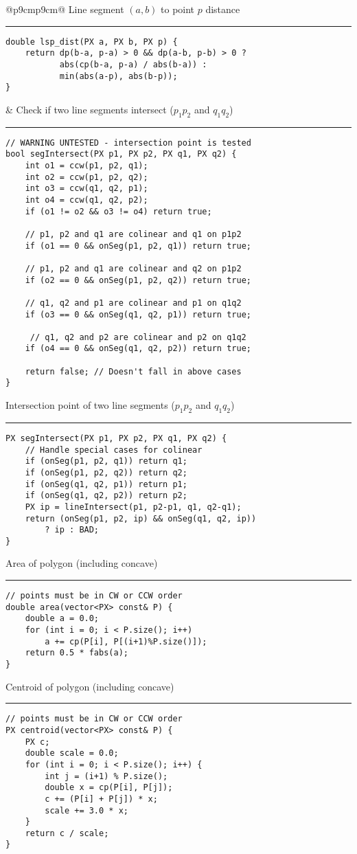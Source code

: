 \documentclass[letterpaper]{article}
\newcommand{\rx}[1]{#1\hrule}
\begin{document}
\begin{tabular}{@{}p{9cm}p{9cm}@{}}
\rx{Line segment $(a, b)$ to point $p$ distance}
\begin{lstlisting}
double lsp_dist(PX a, PX b, PX p) {
	return dp(b-a, p-a) > 0 && dp(a-b, p-b) > 0 ?
	       abs(cp(b-a, p-a) / abs(b-a)) :
	       min(abs(a-p), abs(b-p));
}
\end{lstlisting}
&
\rx{Check if two line segments intersect ($p_1p_2$ and $q_1q_2$)}
\begin{lstlisting}
// WARNING UNTESTED - intersection point is tested
bool segIntersect(PX p1, PX p2, PX q1, PX q2) {
    int o1 = ccw(p1, p2, q1);
    int o2 = ccw(p1, p2, q2);
    int o3 = ccw(q1, q2, p1);
    int o4 = ccw(q1, q2, p2);
    if (o1 != o2 && o3 != o4) return true;

    // p1, p2 and q1 are colinear and q1 on p1p2
    if (o1 == 0 && onSeg(p1, p2, q1)) return true;
 
    // p1, p2 and q1 are colinear and q2 on p1p2
    if (o2 == 0 && onSeg(p1, p2, q2)) return true;
 
    // q1, q2 and p1 are colinear and p1 on q1q2
    if (o3 == 0 && onSeg(q1, q2, p1)) return true;
 
     // q1, q2 and p2 are colinear and p2 on q1q2
    if (o4 == 0 && onSeg(q1, q2, p2)) return true;
 
    return false; // Doesn't fall in above cases
}
\end{lstlisting}

\rx{Intersection point of two line segments ($p_1p_2$ and $q_1q_2$)}
\begin{lstlisting}
PX segIntersect(PX p1, PX p2, PX q1, PX q2) {
	// Handle special cases for colinear
	if (onSeg(p1, p2, q1)) return q1;
	if (onSeg(p1, p2, q2)) return q2;
	if (onSeg(q1, q2, p1)) return p1;
	if (onSeg(q1, q2, p2)) return p2;
	PX ip = lineIntersect(p1, p2-p1, q1, q2-q1);
	return (onSeg(p1, p2, ip) && onSeg(q1, q2, ip))
		? ip : BAD;
}
\end{lstlisting}
\rx{Area of polygon (including concave)}
\begin{lstlisting}
// points must be in CW or CCW order
double area(vector<PX> const& P) {
	double a = 0.0;
	for (int i = 0; i < P.size(); i++)
		a += cp(P[i], P[(i+1)%P.size()]);
	return 0.5 * fabs(a);
}
\end{lstlisting}

\rx{Centroid of polygon (including concave)}
\begin{lstlisting}
// points must be in CW or CCW order
PX centroid(vector<PX> const& P) {
	PX c;
	double scale = 0.0;
	for (int i = 0; i < P.size(); i++) {
		int j = (i+1) % P.size();
		double x = cp(P[i], P[j]);
		c += (P[i] + P[j]) * x;
		scale += 3.0 * x;
	}
	return c / scale;
}
\end{lstlisting}
\end{tabular}
\end{document}
